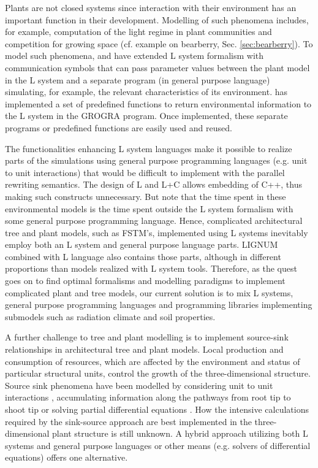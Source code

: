 Plants are not closed systems since interaction with their environment
has  an important function  in their  development.  Modelling  of such
phenomena includes,  for example, computation  of the light  regime in
plant communities  and competition for growing space  (cf.  example on
bearberry,  Sec.   \ref{sec:bearberry}).   To  model  such  phenomena,
\citet{mech:97} and  \citet{mech:96} have extended  L system formalism
with communication symbols that  can pass parameter values between the
plant model in the L system and a separate program (in general purpose
language) simulating, for example, the relevant characteristics of its
environment.   \citet{kurth:94} has  implemented a  set  of predefined
functions to return  environmental information to the L  system in the
GROGRA  program.    Once  implemented,  these   separate  programs  or
predefined functions are easily used and reused.

The functionalities  enhancing L system languages make  it possible to
realize  parts of  the simulations  using general  purpose programming
languages (e.g.  unit to unit interactions) that would be difficult to
implement with the parallel rewriting  semantics.  The design of L and
L+C allows embedding of  C++, thus making such constructs unnecessary.
But note that the time spent in these environmental models is the time
spent  outside  the  L  system  formalism with  some  general  purpose
programming language.  Hence, complicated architectural tree and plant
models, such as FSTM's,  implemented using L systems inevitably employ
both an L system and  general purpose language parts.  LIGNUM combined
with  L language  also  contains those  parts,  although in  different
proportions than  models realized with L system  tools.  Therefore, as
the quest goes  on to find optimal formalisms  and modelling paradigms
to implement  complicated plant and tree models,  our current solution
is  to  mix  L  systems,  general purpose  programming  languages  and
programming libraries implementing submodels such as radiation climate
and soil properties.
 
A  further challenge  to  tree  and plant  modelling  is to  implement
source-sink  relationships  in architectural  tree  and plant  models.
Local production  and consumption of resources, which  are affected by
the environment and status of particular structural units, control the
growth of the three-dimensional structure.  Source sink phenomena have
been   modelled    by   considering   unit    to   unit   interactions
\citep{balandier:00}, accumulating information along the pathways from
root  tip   to  shoot  tip  \citep{dereffye:97}   or  solving  partial
differential  equations  \citep{deleuze:97,  palovaara:03}.   How  the
intensive calculations  required by the sink-source  approach are best
implemented in the three-dimensional plant structure is still unknown.
A  hybrid  approach  utilizing  both  L systems  and  general  purpose
languages  or other  means (e.g.   solvers of  differential equations)
offers one alternative.

